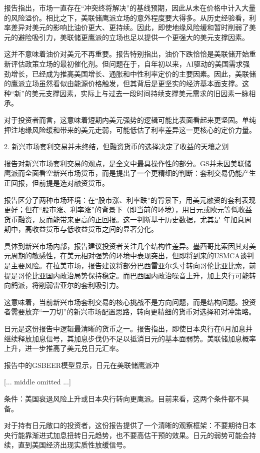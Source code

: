 \documentclass[11pt]{ctexart}
\begin{document}
报告指出，市场一直存在“冲突终将解决”的基线预期，因此从未在价格中计入大量的风险溢价。相比之下，美联储鹰派立场的意外程度要大得多。从历史经验看，利率差异对美元的影响比油价更大、更持续。因此，即使地缘风险缓和暂时削弱了美元的避险吸引力，美联储更鹰派的立场也足以提供一个更强大的美元支撑因素。

这并不意味着油价对美元不再重要。报告特别指出，油价下跌恰恰是美联储开始重新评估政策立场的最初催化剂。但问题在于，自年初以来，AI驱动的美国需求强劲增长，已经成为推高美国增长、通胀和中性利率定价的主要因素。因此，美联储的鹰派立场虽然看似由能源价格触发，但其背后是更坚实的经济基本面支撑。这种“新”的美元支撑因素，实际上与过去一段时间持续支撑美元需求的旧因素一脉相承。

对于投资者而言，这意味着短期内美元强势的逻辑可能比表面看起来更坚固。单纯押注地缘风险缓和带来的美元走弱，可能低估了利率差异这一更核心的定价力量。

2. 新兴市场套利交易并未终结，但融资货币的选择决定了收益的天壤之别

报告对新兴市场套利交易的观点，是全文中最具操作性的部分。GS并未因美联储鹰派而全面看空新兴市场货币，而是提出了一个更精细的判断：套利交易仍能产生正回报，但前提是选对融资货币。

报告区分了两种市场环境：在“股市涨、利率跌”的背景下，用美元融资的套利表现更好；但在“股市涨、利率涨”的背景下（即当前的环境），用日元或欧元等低收益货币融资，反而能带来更高的正回报。这一判断基于历史数据，尤其是 年加息周期中，高收益货币与低收益货币之间的显著分化。

具体到新兴市场内部，报告建议投资者关注几个结构性差异。墨西哥比索因其对美元周期的敏感性，在美元相对强势的环境中表现突出，但即将到来的USMCA谈判是主要风险。在拉美市场，报告建议将部分巴西雷亚尔头寸转向哥伦比亚比索，前提是哥伦比亚国内政治局势保持稳定。而巴西国内政治噪音上升，加上央行可能转向鸽派，将削弱雷亚尔的套利吸引力。

这意味着，当前新兴市场套利交易的核心挑战不是方向问题，而是结构问题。投资者需要放弃“一刀切”的新兴市场配置思路，转向更精细的货币对选择和对冲策略。

日元是这份报告中逻辑最清晰的货币之一。报告指出，即使日本央行在6月加息并继续释放加息信号，其加息步伐仍不足以抵消日元的基本面弱势。美联储加息概率上升，进一步推高了美元兑日元汇率。

报告中的GSBEER模型显示，日元在美联储鹰派冲

[... middle omitted ...]

条件：美国衰退风险上升或日本央行转向更鹰派。目前来看，这两个条件都不具备。

对于持有日元敞口的投资者，这份报告提供了一个清晰的观察框架：不要期待日本央行能靠渐进式加息扭转日元趋势，也不要高估干预的效果。日元的弱势可能会持续，直到美国经济出现实质性放缓信号。
\end{document}

